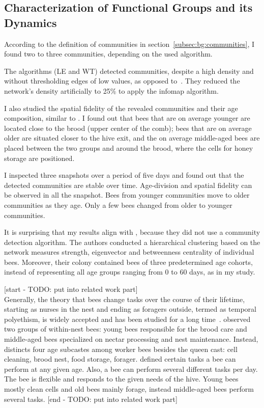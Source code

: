 \subsection{Characterization of Functional Groups and its Dynamics}
According to the definition of communities in section~\ref{subsec:bg:communities}, I found two to three communities, depending on the used algorithm.

The algorithms (LE and WT) detected communities, despite a high density and without thresholding edges of low values, as opposed to~\textcite{mersch2013tracking}.
They reduced the network's density artificially to 25\% to apply the infomap algorithm.

I also studied the spatial fidelity of the revealed communities and their age composition, similar to \textcite{baracchi2014socio}. I found out that bees that are on average younger are located close to the brood (upper center of the comb); bees that are on average older are situated closer to the hive exit, and the on average middle-aged bees are placed between the two groups and around the brood, where the cells for honey storage are positioned.

I inspected three snapshots over a period of five days and found out that the detected communities are stable over time. Age-division and spatial fidelity can be observed in all the snapshot.
Bees from younger communities move to older communities as they age. Only a few bees changed from older to younger communities.

It is surprising that my results align with \textcite{baracchi2014socio}, because they did not use a community detection algorithm. The authors conducted a hierarchical clustering based on the network measures strength, eigenvector and betweenness centrality of individual bees. Moreover, their colony contained bees of three predetermined age cohorts, instead of representing all age groups ranging from 0 to 60 days, as in my study.

[start - TODO: put into related work part]\\
Generally, the theory that bees change tasks over the course of their lifetime, starting as nurses in the nest and ending as foragers outside, termed as temporal polyethism,  is widely accepted and has been studied for a long time~\cite{seeley1982adaptive, johnson2008within, lindauer1952beitrag}.
\textcite{johnson2008within} observed two groups of within-nest bees: young bees responsible for the brood care and middle-aged bees specialized on nectar processing and nest maintenance. Instead, \textcite{seeley1982adaptive} distincts four age subcastes among worker bees besides the queen cast: cell cleaning, brood nest, food storage, forager. \textcite{lindauer1952beitrag} defined certain tasks a bee can perform at any given age. Also, a bee can perform several different tasks per day. The bee is flexible and responds to the given needs of the hive. Young bees mostly clean cells and old bees mainly forage, instead middle-aged bees perform several tasks.
[end - TODO: put into related work part]\\

